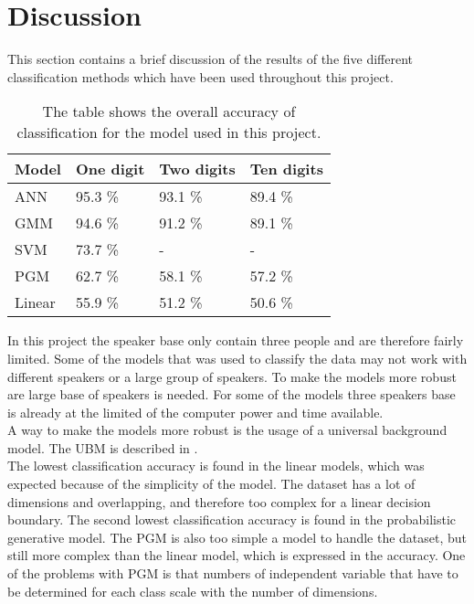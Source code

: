 \section*{Discussion}
This section contains a brief discussion of the results of the five different classification methods which have been used throughout this project. 

\begin{table}[h]
\begin{tabular}{@{}l|lll@{}}
\toprule
Model 		   		   & One digit            & Two digits  & Ten digits   \\ \midrule
ANN                    & 95.3 \%                & 93.1 \%   & 89.4 \% \\
GMM                    & 94.6 \%                & 91.2 \%   & 89.1 \% \\
SVM                    & 73.7 \%                & - 	    & -       \\ 
PGM                    & 62.7 \% 				& 58.1 \%   & 57.2 \% \\
Linear                 & 55.9 \% 				& 51.2 \%   & 50.6 \%

\end{tabular}
\caption{The table shows the overall accuracy of classification for the model used in this project. }
\label{table:result}
\end{table}

In this project the speaker base only contain three people and are therefore fairly limited. 
Some of the models that was used to classify the data may not work with different speakers or a large group of speakers.
To make the models more robust are large base of speakers is needed.
For some of the models three speakers base is already at the limited of the computer power and time available.\\

A way to make the models more robust is the usage of a universal background model.
The UBM is described in \cite{Springer:36}.\\

The lowest classification accuracy is found in the linear models, which was expected because of the simplicity of the model.
The dataset has a lot of dimensions and overlapping, and therefore too complex for a linear decision boundary.
The second lowest classification accuracy is found in the probabilistic generative model. 
The PGM is also too simple a model to handle the dataset, but still more complex than the linear model, which is expressed in the accuracy.
One of the problems with PGM is that numbers of independent variable that have to be determined for each class scale with the number of dimensions.\\

